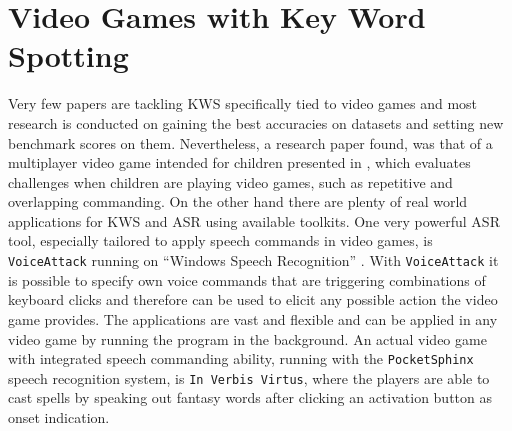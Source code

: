 
\section{Video Games with Key Word Spotting}\label{sec:prev_kws_games}
Very few papers are tackling KWS specifically tied to video games and most research is conducted on gaining the best accuracies on datasets and setting new benchmark scores on them.
Nevertheless, a research paper found, was that of a multiplayer video game intended for children presented in \cite{Harshavardhan2015}, which evaluates challenges when children are playing video games, such as repetitive and overlapping commanding.
On the other hand there are plenty of real world applications for KWS and ASR using available toolkits.
One very powerful ASR tool, especially tailored to apply speech commands in video games, is \texttt{VoiceAttack} running on \enquote{Windows Speech Recognition} \cite{Xiong2017}.
With \texttt{VoiceAttack} it is possible to specify own voice commands that are triggering combinations of keyboard clicks and therefore can be used to elicit any possible action the video game provides.
The applications are vast and flexible and can be applied in any video game by running the program in the background.
An actual video game with integrated speech commanding ability, running with the \texttt{PocketSphinx} \cite{Huggins2006} speech recognition system, is \texttt{In Verbis Virtus}, where the players are able to cast spells by speaking out fantasy words after clicking an activation button as onset indication.